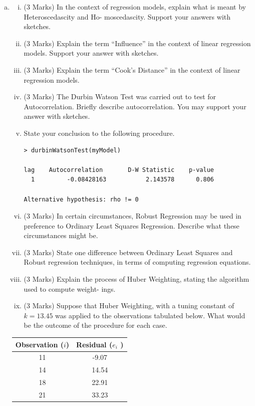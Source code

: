 \documentclass[a4paper,12pt]{article}
\begin{document}
\begin{enumerate}
\begin{enumerate}[(a)]
\item
\begin{enumerate}[(i)]

\item (3 Marks) In the context of regression models, explain what is meant by Heteroscedascity and Ho-
moscedascity. Support your answers with sketches.
\item (3 Marks) Explain the term “Influence” in the context of linear regression models. Support your
answer with sketches.
\item (3 Marks) Explain the term “Cook’s Distance” in the context of linear regression models.
\item (3 Marks) The Durbin Watson Test was carried out to test for Autocorrelation. Briefly describe
autocorrelation. You may support your answer with sketches.
\item State your conclusion to the following procedure.
\begin{framed}
\begin{verbatim}
> durbinWatsonTest(myModel)

lag    Autocorrelation       D-W Statistic    p-value
  1         -0.08428163           2.143578      0.806

Alternative hypothesis: rho != 0
\end{verbatim}
\end{framed}
\item (3 Marks) In certain circumstances, Robust Regression may be used in preference to Ordinary Least
Squares Regression. Describe what these circumstances might be.
\item (3 Marks) State one difference between Ordinary Least Squares and Robust regression techniques,
in terms of computing regression equations.
\item (3 Marks) Explain the process of Huber Weighting, stating the algorithm used to compute weight-
ings.
\item (3 Marks) Suppose that Huber Weighting, with a tuning constant of $k = 13.45$ was applied to the
observations tabulated below. What would be the outcome of the procedure for each case.
\end{enumerate}

\smallskip
\begin{center}
	\begin{tabular}{|c|c|}\hline
Observation ($i$)   & Residual ($e_i$ ) \\ \hline
11       &  -9.07   \\ \hline
14       &   14.54  \\ \hline 
18       &   22.91  \\ \hline
21       &   33.23  \\ \hline
\end{tabular}
\end{center}





\end{enumerate}
\end{enumerate}
\end{document}

